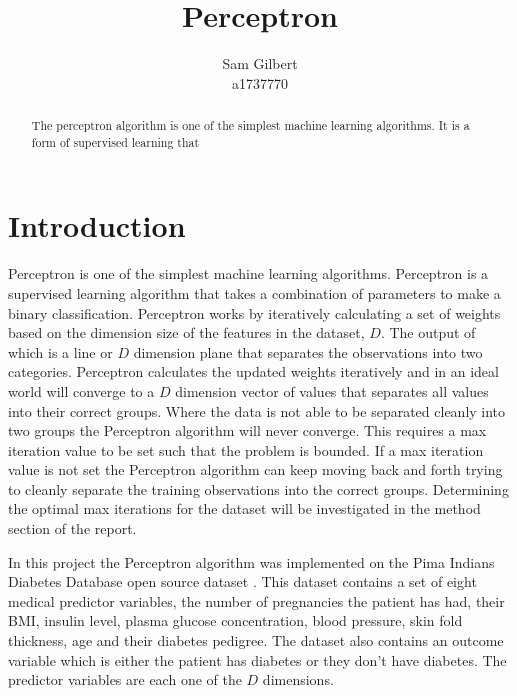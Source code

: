 \documentclass[10pt,twocolumn,letterpaper]{article}
\begin{document}
\title{Perceptron}

\author{Sam Gilbert\\
   a1737770\\}
\maketitle

\begin{abstract}
   The perceptron algorithm is one of the simplest machine learning algorithms. It is a
   form of supervised learning that
\end{abstract}

\section{Introduction}

Perceptron is one of the simplest machine learning algorithms. Perceptron is a supervised learning
algorithm that takes a combination of parameters to make a binary classification.
Perceptron works by iteratively calculating a set of weights based on the dimension size
of the features in the dataset, $D$. The output of which is a line or $D$ dimension plane
that separates the observations into two categories. Perceptron calculates the updated
weights iteratively and in an ideal world will converge to a $D$ dimension vector of values
that separates all values into their correct groups. Where the data is not able to be
separated cleanly into two groups the Perceptron algorithm will never converge. This requires
a max iteration value to be set such that the problem is bounded. If a max iteration value
is not set the Perceptron algorithm can keep moving back and forth trying to cleanly separate
the training observations into the correct groups. Determining the optimal max iterations
for the dataset will be investigated in the method section of the report.

In this project the Perceptron algorithm was implemented on the Pima Indians Diabetes Database
open source dataset \cite{kagglePimaIndians}. This dataset contains a set of eight medical
predictor variables, the number of pregnancies the patient has had, their BMI, insulin level,
plasma glucose concentration, blood pressure, skin fold thickness, age and their diabetes
pedigree. The dataset also contains an outcome variable which is either the patient has
diabetes or they don't have diabetes. The predictor variables are each one of the $D$
dimensions.
\end{document}
